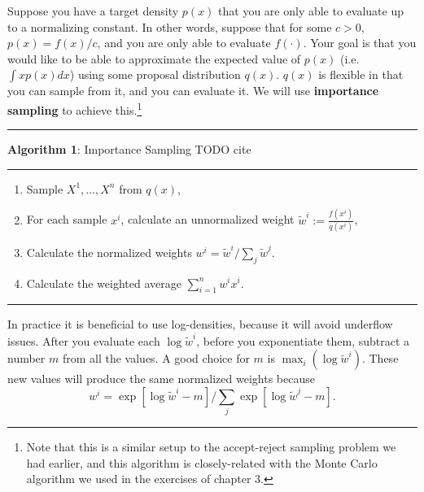 \documentclass[
  12pt,
  krantz2]{krantz}
\providecommand{\tightlist}{%
  \setlength{\itemsep}{0pt}\setlength{\parskip}{0pt}}
\begin{document}
Suppose you have a target density \(p(x)\) that you are only able to evaluate up to a normalizing constant. In other words, suppose that for some \(c > 0\), \(p(x) = f(x) / c\), and you are only able to evaluate \(f(\cdot)\). Your goal is that you would like to be able to approximate the expected value of \(p(x)\) (i.e.~\(\int x p(x) dx\)) using some proposal distribution \(q(x)\). \(q(x)\) is flexible in that you can sample from it, and you can evaluate it. We will use \textbf{importance sampling} to achieve this.\footnote{Note that this is a similar setup to the accept-reject sampling problem we had earlier, and this algorithm is closely-related with the Monte Carlo algorithm we used in the exercises of chapter 3.}

\begin{center}\rule{0.5\linewidth}{0.5pt}\end{center}

\textbf{Algorithm 1}: Importance Sampling TODO cite

\begin{center}\rule{0.5\linewidth}{0.5pt}\end{center}

\begin{enumerate}
\def\labelenumi{\arabic{enumi}.}
\tightlist
\item
  Sample \(X^1, \ldots, X^n\) from \(q(x)\),
\item
  For each sample \(x^i\), calculate an unnormalized weight \(\tilde{w}^i:= \frac{f(x^i)}{q(x^i)}\),
\item
  Calculate the normalized weights \(w^i = \tilde{w}^i \bigg/ \sum_j \tilde{w}^j\).
\item
  Calculate the weighted average \(\sum_{i=1}^n w^i x^i\).
\end{enumerate}

\begin{center}\rule{0.5\linewidth}{0.5pt}\end{center}

In practice it is beneficial to use log-densities, because it will avoid underflow issues. After you evaluate each \(\log \tilde{w}^i\), before you exponentiate them, subtract a number \(m\) from all the values. A good choice for \(m\) is \(\max_i (\log \tilde{w}^i)\). These new values will produce the same normalized weights because
\[
w^i = \exp[ \log \tilde{w}^i - m] \bigg/ \sum_j \exp[\log \tilde{w}^j - m].
\]
\end{document}
